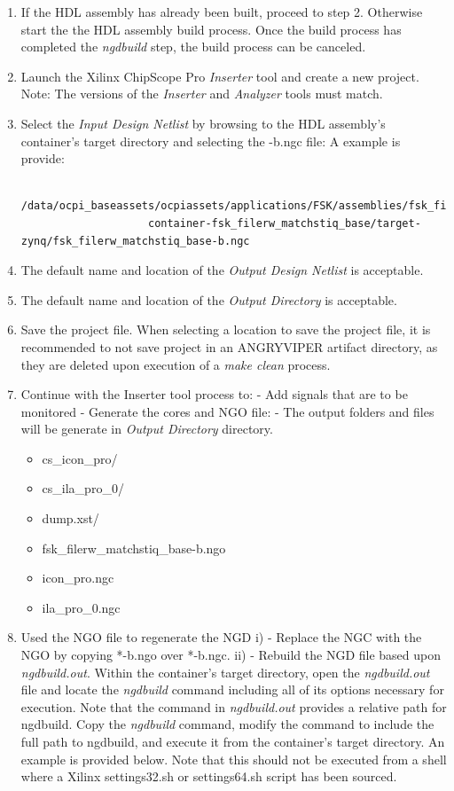 \begin{flushleft}
		\begin{enumerate}
			\item If the HDL assembly has already been built, proceed to step 2. Otherwise start the
			the HDL assembly build process. Once the build process has completed the \textit{ngdbuild} step, the build process can be canceled.
			\item Launch the Xilinx ChipScope Pro \textit{Inserter} tool and create a new project.
				\subitem Note: The versions of the \textit{Inserter} and \textit{Analyzer} tools must match.
			\item Select the \textit{Input Design Netlist} by browsing to the HDL assembly's container's target directory and selecting the {}-b.ngc file: A example is provide:
				\small\begin{verbatim}
					/data/ocpi_baseassets/ocpiassets/applications/FSK/assemblies/fsk_filerw/
					container-fsk_filerw_matchstiq_base/target-zynq/fsk_filerw_matchstiq_base-b.ngc
			 	\end{verbatim}
			\item The default name and location of the \textit{Output Design Netlist} is acceptable.
			\item The default name and location of the \textit{Output Directory} is acceptable.
			\item Save the project file. When selecting a location to save the project file, it is recommended to not save project in an ANGRYVIPER artifact directory, as they are deleted upon execution of a \textit{make clean} process.
			\item Continue with the Inserter tool process to:
				\subitem - Add signals that are to be monitored
				\subitem - Generate the cores and NGO file:
				\subsubitem - The output folders and files will be generate in \textit{Output Directory} directory.
					\small\begin{itemize}
						\item cs\_icon\_pro/
						\item cs\_ila\_pro\_0/
						\item dump.xst/
						\item fsk\_filerw\_matchstiq\_base-b.ngo
						\item icon\_pro.ngc
						\item ila\_pro\_0.ngc
					\end{itemize}
			\item Used the NGO file to regenerate the NGD
				\subitem i) - Replace the NGC with the NGO by copying *-b.ngo over *-b.ngc.
				\subitem ii) - Rebuild the NGD file based upon \textit{ngdbuild.out}.
					\subsubitem  Within the container's target directory, open the \textit{ngdbuild.out} file and locate the \textit{ngdbuild} command including all of its options necessary for execution. Note that the command in \textit{ngdbuild.out} provides a relative path for ngdbuild. Copy the \textit{ngdbuild} command, modify the command to include the full path to ngdbuild, and execute it from the container's target directory. An example is provided below. Note that this should not be executed from a shell where a Xilinx settings32.sh or settings64.sh script has been sourced.


\end{enumerate}
\end{flushleft}
